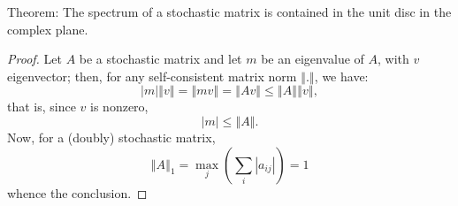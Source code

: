 \documentclass[12pt]{article}
\begin{document}
Theorem:
The spectrum of a stochastic matrix is contained in the unit disc in the complex plane.

\begin{proof}
Let $A$ be a stochastic matrix and let $m$ be an eigenvalue of $A$, with $v$ eigenvector; then, for any self-consistent matrix norm $\left\Vert .\right\Vert $, we have:
\[
\left|m\right|\left\Vert v\right\Vert =\left\Vert mv\right\Vert =\left\Vert Av\right\Vert \leq\left\Vert A\right\Vert \left\Vert v\right\Vert ,
\]
that is, since $v$ is nonzero,
\[
\left|m\right|\leq\left\Vert A\right\Vert .
\]
Now, for a (doubly) stochastic matrix,
\[
\left\Vert A\right\Vert _1 = \max_j \left(\sum_i \left|a_{ij}\right|\right)=1
\]
whence the conclusion.
\end{proof}
\end{document}

